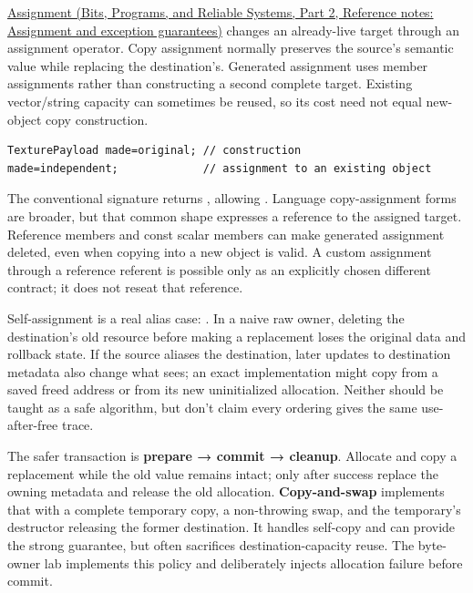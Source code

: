 \hypertarget{05-engine-i-ch003-replacing-a-value-is-not-creating-an-object}{}

\href{../01-Bits-Programs-and-Reliable-Systems-P02/main.pdf\#appendix-bea6beb5350f}{Assignment (Bits, Programs, and Reliable Systems, Part 2, Reference notes: Assignment and exception guarantees)} changes an already-live target through an assignment operator. Copy assignment normally preserves the source's semantic value while replacing the destination's. Generated assignment uses member assignments rather than constructing a second complete target. Existing vector/string capacity can sometimes be reused, so its cost need not equal new-object copy construction.

\begin{verbatim}
TexturePayload made=original; // construction
made=independent;             // assignment to an existing object
\end{verbatim}

The conventional signature  returns , allowing . Language copy-assignment forms are broader, but that common shape expresses a reference to the assigned target. Reference members and const scalar members can make generated assignment deleted, even when copying into a new object is valid. A custom assignment through a reference referent is possible only as an explicitly chosen different contract; it does not reseat that reference.

Self-assignment is a real alias case: . In a naive raw owner, deleting the destination's old resource before making a replacement loses the original data and rollback state. If the source aliases the destination, later updates to destination metadata also change what  sees; an exact implementation might copy from a saved freed address or from its new uninitialized allocation. Neither should be taught as a safe algorithm, but don't claim every ordering gives the same use-after-free trace.

The safer transaction is \textbf{prepare → commit → cleanup}. Allocate and copy a replacement while the old value remains intact; only after success replace the owning metadata and release the old allocation. \textbf{Copy-and-swap} implements that with a complete temporary copy, a non-throwing swap, and the temporary's destructor releasing the former destination. It handles self-copy and can provide the strong guarantee, but often sacrifices destination-capacity reuse. The byte-owner lab implements this policy and deliberately injects allocation failure before commit.

